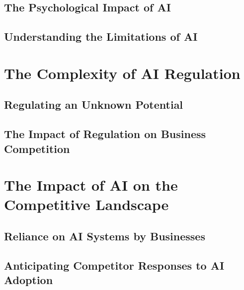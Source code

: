 \documentclass[
]{book}
\begin{document}
\hypertarget{the-psychological-impact-of-ai}{%
\section{The Psychological Impact of AI}\label{the-psychological-impact-of-ai}}

\hypertarget{understanding-the-limitations-of-ai}{%
\section{Understanding the Limitations of AI}\label{understanding-the-limitations-of-ai}}

\hypertarget{the-complexity-of-ai-regulation}{%
\chapter{The Complexity of AI Regulation}\label{the-complexity-of-ai-regulation}}

\hypertarget{regulating-an-unknown-potential}{%
\section{Regulating an Unknown Potential}\label{regulating-an-unknown-potential}}

\hypertarget{the-impact-of-regulation-on-business-competition}{%
\section{The Impact of Regulation on Business Competition}\label{the-impact-of-regulation-on-business-competition}}

\hypertarget{the-impact-of-ai-on-the-competitive-landscape}{%
\chapter{The Impact of AI on the Competitive Landscape}\label{the-impact-of-ai-on-the-competitive-landscape}}

\hypertarget{reliance-on-ai-systems-by-businesses}{%
\section{Reliance on AI Systems by Businesses}\label{reliance-on-ai-systems-by-businesses}}

\hypertarget{anticipating-competitor-responses-to-ai-adoption}{%
\section{Anticipating Competitor Responses to AI Adoption}\label{anticipating-competitor-responses-to-ai-adoption}}
\end{document}
